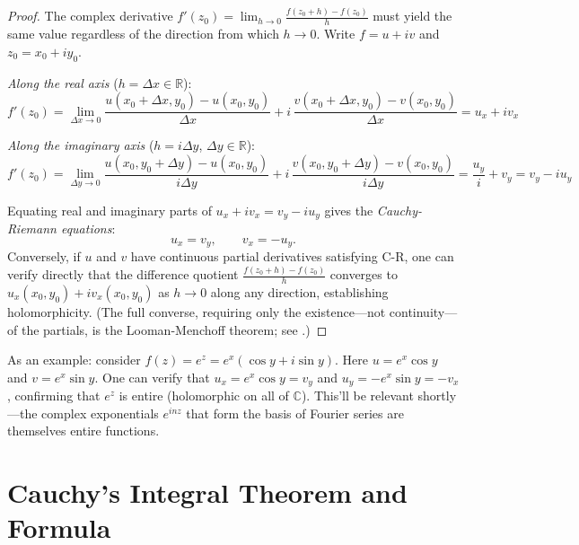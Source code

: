 \documentclass[12pt,a4paper]{report}
\theoremstyle{thms}
\theoremstyle{defns}
\begin{document}
\begin{proof}
    The complex derivative $f'(z_0) = \lim_{h\to 0} \frac{f(z_0+h) - f(z_0)}{h}$ must yield the same value regardless of the direction from which $h \to 0$. Write $f = u + iv$ and $z_0 = x_0 + iy_0$.

    \textit{Along the real axis} ($h = \Delta x \in \mathbb{R}$):
    \begin{equation}
        f'(z_0) = \lim_{\Delta x \to 0} \dfrac{u(x_0 + \Delta x, y_0) - u(x_0, y_0)}{\Delta x} + i\,\dfrac{v(x_0 + \Delta x, y_0) - v(x_0, y_0)}{\Delta x} = u_x + iv_x
    \end{equation}

    \textit{Along the imaginary axis} ($h = i\Delta y$, $\Delta y \in \mathbb{R}$):
    \begin{equation}
        f'(z_0) = \lim_{\Delta y \to 0} \dfrac{u(x_0, y_0 + \Delta y) - u(x_0, y_0)}{i\Delta y} + i\,\dfrac{v(x_0, y_0 + \Delta y) - v(x_0, y_0)}{i\Delta y} = \dfrac{u_y}{i} + v_y = v_y - iu_y
    \end{equation}

    Equating real and imaginary parts of $u_x + iv_x = v_y - iu_y$ gives the \emph{Cauchy-Riemann equations}:
    \begin{equation}
        u_x = v_y, \qquad v_x = -u_y.
    \end{equation}
    Conversely, if $u$ and $v$ have continuous partial derivatives satisfying C-R, one can verify directly that the difference quotient $\frac{f(z_0 + h) - f(z_0)}{h}$ converges to $u_x(x_0, y_0) + iv_x(x_0, y_0)$ as $h \to 0$ along any direction, establishing holomorphicity. (The full converse, requiring only the existence—not continuity—of the partials, is the Looman-Menchoff theorem; see \cite{ahlfors_complex}.)
\end{proof}

As an example: consider $f(z) = e^z = e^x(\cos y + i\sin y)$. Here $u = e^x\cos y$ and $v = e^x\sin y$. One can verify that $u_x = e^x\cos y = v_y$ and $u_y = -e^x\sin y = -v_x$, confirming that $e^z$ is entire (holomorphic on all of $\mathbb{C}$). This'll be relevant shortly—the complex exponentials $e^{inz}$ that form the basis of Fourier series are themselves entire functions.

\section{Cauchy's Integral Theorem and Formula}
\label{sec:cauchy_integral}
\end{document}
